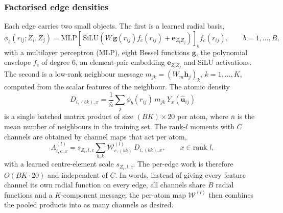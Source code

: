 \documentclass[journal=jctcce,manuscript=article,layout=traditional]{achemso}
\newcommand{\vect}[1]{\bm{#1}}
\begin{document}
\subsubsection{Factorised edge densities}
\label{sec:factor}
Each edge carries two small objects. The first is a learned radial basis,
\begin{equation}
\phi_b(r_{ij};Z_i,Z_j)=\mathrm{MLP}\!\left[\,\mathrm{SiLU}\!\left(W\,\mathbf g(r_{ij})f_c(r_{ij})+\vect e_{Z_iZ_j}\right)\right]_b f_c(r_{ij}),\qquad b=1,\dots,B,
\label{eq:radial}
\end{equation}
with a multilayer perceptron (MLP), eight Bessel functions $\mathbf g$, the polynomial envelope $f_c$ of degree 6, an element-pair embedding
$\vect e_{Z_iZ_j}$ and SiLU activations\cite{elfwing2018silu}. The second is a low-rank neighbour message
$m_{jk}=(W_m\vect h_j)_k$, $k=1,\dots,K$, computed from the scalar features of the neighbour. The atomic density
\begin{equation}
D_{i,(bk),x}=\frac{1}{\bar n}\sum_j \phi_b(r_{ij})\,m_{jk}\,Y_x(\hat{\vect u}_{ij})
\label{eq:density}
\end{equation}
is a single batched matrix product of size $(BK)\times20$ per atom, where $\bar n$ is the mean number of neighbours
in the training set. The rank-$l$ moments with $C$ channels are obtained by channel maps that act per atom,
\begin{equation}
A^{(l)}_{i,c,x}=s_{Z_i,l,c}\sum_{b,k}\mathcal W^{(l)}_{c,(bk)}\,D_{i,(bk),x},\qquad x\in\text{rank }l,
\label{eq:channelmap}
\end{equation}
with a learned centre-element scale $s_{Z_i,l,c}$. The per-edge work is therefore $O(BK\cdot20)$ and independent
of $C$. In words, instead of giving every feature channel its own radial function on every edge, all channels share
$B$ radial functions and a $K$-component message; the per-atom map $\mathcal W^{(l)}$ then combines the pooled
products into as many channels as desired.
\end{document}

